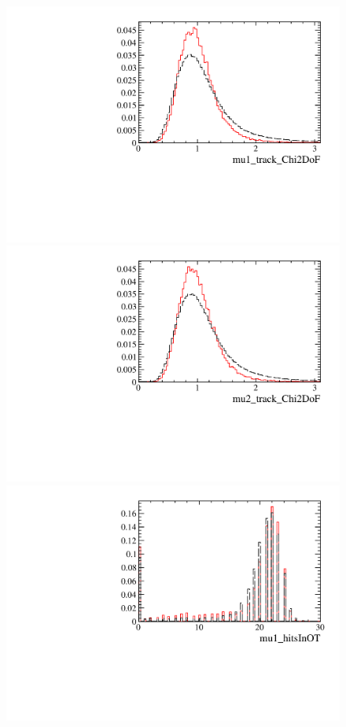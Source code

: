 \begin{figure} [htb!]
\begin{center}
\includegraphics[scale=0.20]{figs/mu1_track_Chi2DoFPARTIAL2pipi.pdf}
\includegraphics[scale=0.20]{figs/mu2_track_Chi2DoFPARTIAL2pipi.pdf}
\includegraphics[scale=0.20]{figs/mu1_hitsInOTPARTIAL2pipi.pdf}

\end{center}
\end{figure}
